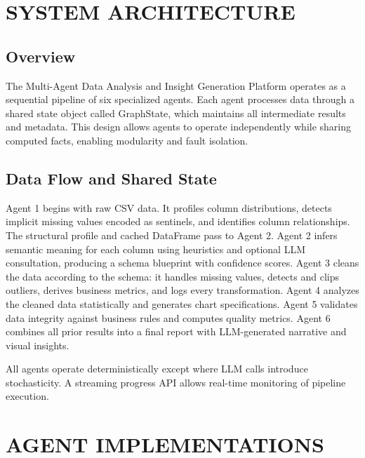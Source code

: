 
\chapter{SYSTEM ARCHITECTURE}
\label{ch:architecture}

\section{Overview}

The Multi-Agent Data Analysis and Insight Generation Platform operates as a sequential pipeline of six specialized agents. Each agent processes data through a shared state object called GraphState, which maintains all intermediate results and metadata. This design allows agents to operate independently while sharing computed facts, enabling modularity and fault isolation.

\section{Data Flow and Shared State}

Agent 1 begins with raw CSV data. It profiles column distributions, detects implicit missing values encoded as sentinels, and identifies column relationships. The structural profile and cached DataFrame pass to Agent 2. Agent 2 infers semantic meaning for each column using heuristics and optional LLM consultation, producing a schema blueprint with confidence scores. Agent 3 cleans the data according to the schema: it handles missing values, detects and clips outliers, derives business metrics, and logs every transformation. Agent 4 analyzes the cleaned data statistically and generates chart specifications. Agent 5 validates data integrity against business rules and computes quality metrics. Agent 6 combines all prior results into a final report with LLM-generated narrative and visual insights.

All agents operate deterministically except where LLM calls introduce stochasticity. A streaming progress API allows real-time monitoring of pipeline execution.

\chapter{AGENT IMPLEMENTATIONS}
\label{ch:agents}

